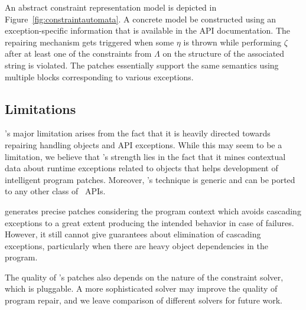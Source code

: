 An abstract constraint representation model is depicted in
Figure~\ref{fig:constraintautomata}. A concrete model be constructed using an
exception-specific information that is available in the API documentation. The
repairing mechanism gets triggered when some $\eta$ is thrown while performing
$\zeta$ after at least one of the constraints from $\Lambda$ on the structure of
the associated string is violated. The patches essentially support the same
semantics using multiple  blocks corresponding to various
exceptions.


\subsection{Limitations}
\label{sec:tool:limitation}

\tool's major limitation arises from the fact that it is heavily directed
towards repairing handling  objects and API exceptions. While this
may seem to be a limitation, we believe that \tool's strength lies in the fact
that it mines contextual data about runtime exceptions related to 
objects that helps development of intelligent program patches. Moreover, \tool's
technique is generic and can be ported to any other class of \java\ APIs.

\tool generates precise patches considering the program context which avoids
cascading exceptions to a great extent producing the intended behavior in case
of failures. However, it still cannot give guarantees about elimination of cascading
exceptions, particularly when there are heavy object dependencies in the program.

The quality of \tool's patches also depends on the nature of the constraint
solver, which is pluggable. A more sophisticated solver may improve the quality
of program repair, and we leave comparison of different solvers for future work.

